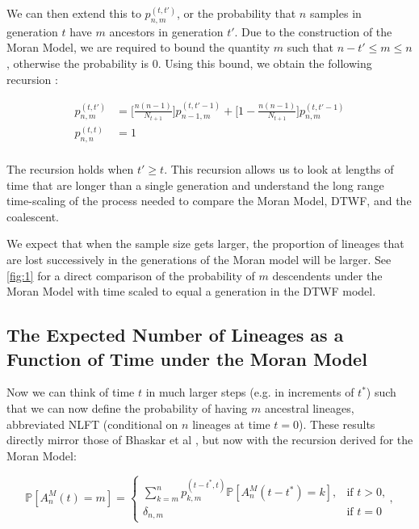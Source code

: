 \documentclass[10.5pt]{article}
\begin{document}
We can then extend this to $p^{(t, t')}_{n,m}$, or the probability that $n$ samples in generation $t$ have $m$  ancestors in generation $t'$. Due to the construction of the Moran Model, we are required to bound the quantity $m$ such that $n - t' \leq m \leq n$, otherwise the probability is $0$. Using this bound, we obtain the following recursion :

\begin{equation}
\begin{aligned}
	p^{(t, t')}_{n,m} &= \Bigg[\frac{n(n-1)}{N_{t+1}}\Bigg] p^{(t, t'-1)}_{n-1, m} + \Bigg[1 - \frac{n(n-1)}{N_{t+1}}\Bigg] p^{(t, t'-1)}_{n,m}\\
	p^{(t, t)}_{n,n} &= 1\\
\end{aligned}
\end{equation}

The recursion holds when $t' \geq t$. This recursion allows us to look at lengths of time that are longer than a single generation and understand the long range time-scaling of the process needed to compare the Moran Model, DTWF, and the coalescent.

We expect that when the sample size gets larger, the proportion of lineages that are lost successively in the generations of the Moran model will be larger. See \ref{fig:1} for a direct comparison of the probability of $m$ descendents under the Moran Model with time scaled to equal a generation in the DTWF model.

\subsection{The Expected Number of Lineages as a Function of Time under the Moran Model}

Now we can think of time $t$ in much larger steps (e.g. in increments of $t^*$) such that we can now define the probability of having $m$ ancestral lineages, abbreviated NLFT (conditional on $n$ lineages at time $t = 0$). These results directly mirror those of Bhaskar et al \citet{Bhaskar2014}, but now with the recursion derived for the Moran Model:

\begin{equation}
 \mathbb{P}[A^M_n(t) = m] =
 \begin{cases}
	 \sum^n_{k=m}  p^{(t-t^*, t)}_{k,m} \mathbb{P}[A^M_n (t-t^*) = k],  &\text{if $t > 0$,}
 	 \\
	 \delta_{n,m} &\text{if $t = 0$}
 \end{cases},
\end{equation}
\end{document}
